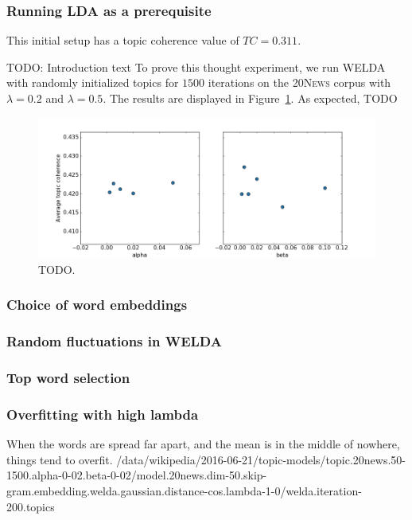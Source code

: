 \documentclass[
        a4paper,
        titlepage,
        twoside,
        parskip
        ]{scrbook}
\theoremstyle{break}
\begin{document}
\subsubsection{Running LDA as a prerequisite}
This initial setup has a topic coherence value of $TC = 0.311$.

TODO: Introduction text
To prove this thought experiment, we run WELDA with randomly initialized topics for $1500$ iterations on the \textsc{20News} corpus with $\lambda = 0.2$ and $\lambda = 0.5$.
The results are displayed in Figure~\ref{fig:standard_lda_as_prerequisite}.
As expected, TODO

\begin{figure}
       \centering
       \includegraphics[width=\textwidth]{figures/standard_lda_alpha_beta.png}
       \caption{TODO.}
       \label{fig:standard_lda_as_prerequisite}
\end{figure}



\subsubsection{Choice of word embeddings}
\subsubsection{Random fluctuations in WELDA}
\subsubsection{Top word selection}

\subsubsection{Overfitting with high lambda}
When the words are spread far apart, and the mean is in the middle of nowhere, things tend to overfit.
/data/wikipedia/2016-06-21/topic-models/topic.20news.50-1500.alpha-0-02.beta-0-02/model.20news.dim-50.skip-gram.embedding.welda.gaussian.distance-cos.lambda-1-0/welda.iteration-200.topics
\end{document}
